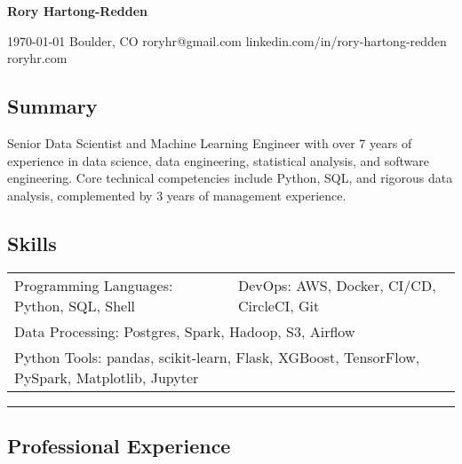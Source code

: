 \documentclass[10pt,letterpaper]{article}
\newenvironment{indentsection}[1]
{\begin{list}{}%
	{\setlength{\leftmargin}{#1}}
	\item[]%
}
{\end{list}}
\begin{document}
{\raggedright \LARGE \bf Rory Hartong-Redden}

{\raggedleft 
\today \/ \textbar
\/ Boulder, CO \textbar
\/ roryhr@gmail.com \textbar
\/ linkedin.com/in/rory-hartong-redden \textbar
\/ roryhr.com
\\
}


\subsection*{Summary}
\begin{centering}
Senior Data Scientist and Machine Learning Engineer with over 7 years of experience in data science, data engineering, statistical analysis, and software engineering. 
Core technical competencies include Python, SQL, and rigorous data analysis, complemented by 3 years of management experience.
\end{centering}

\subsection*{Skills}
\begin{indentsection}{\parindent}
\begin{tabular}{p{0.5\linewidth}   p{0.5\linewidth}} 
	Programming Languages: Python, SQL, Shell
	& DevOps: AWS, Docker,  CI/CD, CircleCI, Git \\

	\multicolumn{2}{l}{Data Processing: Postgres, Spark, Hadoop, S3, Airflow} \\
	\multicolumn{2}{l}{
		Python Tools: pandas, scikit-learn, Flask, XGBoost, TensorFlow, PySpark, Matplotlib, Jupyter
		}
\end{tabular}
\end{indentsection}

\hrule
\subsection*{Professional Experience}
\end{document}
